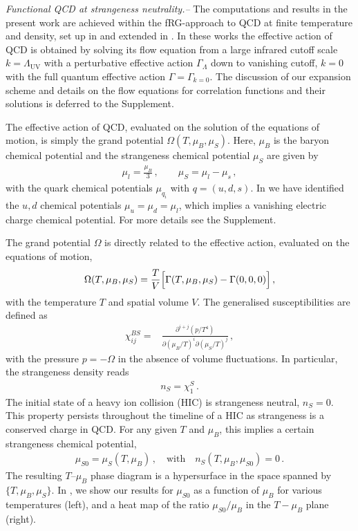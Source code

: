 \documentclass[reprint,twocolumn,superscriptaddress,preprintnumbers,amsmath,amssymb,aps,prd,floatfix]{revtex4-2}
\begin{document}
\emph{Functional QCD at strangeness neutrality.--}
%
The computations and results in the present work are achieved within the fRG-approach to QCD at finite temperature and density, set up in \cite{Fu:2019hdw} and extended in \cite{Fu:2024rto, Ihssen:2024miv, Pawlowski:2025jpg}. In these works the effective action of QCD is obtained by solving its flow equation from a large infrared cutoff scale $k=\Lambda_\textrm{UV}$ with a perturbative effective action $\Gamma_\Lambda$ 
down to vanishing cutoff, $k=0$ with the full quantum effective action $\Gamma=\Gamma_{k=0}$. The discussion of our expansion scheme and details on the flow equations for correlation functions and their solutions is deferred to the Supplement. 

The effective action of QCD, evaluated on the solution of the equations of motion, is simply the grand potential $\Omega(T,\mu_B,\mu_S)$. Here, $\mu_B$ is the baryon chemical potential and the strangeness chemical potential $\mu_S$ are given by  
%
\begin{align} 
	\mu_l=\frac{\mu_B}{3}\,,\qquad \mu_S=\mu_l-\mu_s\,, 
\label{eq:muB-muS}
\end{align} 
%
with the quark chemical potentials $\mu_{q_i}$ with $q=(u,d,s)$. 
In  we have identified the $u,d$ chemical potentials $\mu_{u}=\mu_d=\mu_l$, which implies a vanishing electric charge chemical potential. For more details see the Supplement.

The grand potential $\Omega$ is directly related to the effective action, evaluated on the equations of motion,
%
\begin{align}
	\Omega(T,\mu_B,\mu_S)=\frac{T}{V}\Bigl[ \Gamma(T,\mu_B,\mu_S)-\Gamma(0,0,0)\Bigr]\,,
	\label{eq:GrandPotential}
\end{align}
%
with the temperature $T$ and spatial volume $V$. The generalised susceptibilities are defined as 
%
\begin{align}
	\chi_{ij}^{BS}=&\frac{\partial^{i+j} (p/T^4)}{\partial(\mu_{B}/T)^{i}\partial(\mu_{S}/T)^{j}}\,,  
\label{eq:generalised_susceptibilities}
\end{align}
%
with the pressure $p=-\Omega$ in the absence of volume fluctuations. 
In particular, the strangeness density reads 
%
\begin{align} 
n_S=\chi_{1}^{S} \,.
\label{eq:nS} 
\end{align} 
%
The initial state of a heavy ion collision (HIC) is strangeness neutral, $n_S=0$. This property persists throughout the timeline of a HIC as strangeness is a conserved charge in QCD. For any given $T$ and $\mu_B$, this implies a certain strangeness chemical potential, 
%
\begin{align} 
	\mu_{S0}= \mu_{S}(T,\mu_B)\,,\quad \textrm{with} \quad n_S(T,\mu_B,\mu_{S0}) =0 \,.
\label{eq:muS0}
\end{align}
%
The resulting $T$--$\mu_B$ phase diagram is a hypersurface in the space spanned by $\{T,\mu_B,\mu_S\}$. In , we show our results for $\mu_{S0}$ as a function of $\mu_B$ for various temperatures (left), and a heat map of the ratio $\mu_{S0}/\mu_{B}$ in the $T - \mu_B $ plane (right). 
\end{document}
